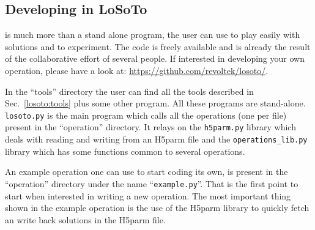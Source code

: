 \documentclass[]{article}
\begin{document}
\subsection{Developing in LoSoTo}
\label{losoto:developing}
\losoto{} is much more than a stand alone program, the user can use \losoto{} to play easily with solutions and to experiment. The code is freely available and is already the result of the collaborative effort of several people. If interested in developing your own operation, please have a look at: \url{https://github.com/revoltek/losoto/}.

In the ``tools'' directory the user can find all the tools described in Sec.~\ref{losoto:tools} plus some other program. All these programs are stand-alone. \texttt{losoto.py} is the main program which calls all the operations (one per file) present in the ``operation'' directory. It relays on the \texttt{h5parm.py} library which deals with reading and writing from an H5parm file and the \texttt{operations\_lib.py} library which has some functions common to several operations.

An example operation one can use to start coding its own, is present in the ``operation'' directory under the name ``\texttt{example.py}''. That is the first point to start when interested in writing a new operation. The most important thing shown in the example operation is the use of the H5parm library to quickly fetch an write back solutions in the H5parm file.
\end{document}
